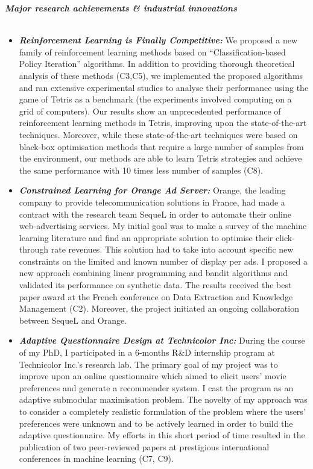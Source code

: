 \noindent\textit{\textbf{Major research achievements \& industrial innovations}}\\[-.4cm]\noindent\makebox[\linewidth]{\rule{\columnwidth}{0.4pt}}\\ %
\begin{itemize}
\item \textit{} \textit{\textbf{Reinforcement Learning is Finally Competitive:}} We proposed a new family of reinforcement learning methods based on ``Classification-based Policy Iteration'' algorithms. In addition to providing thorough theoretical analysis of these methods (C3,C5), we implemented the proposed algorithms and ran extensive experimental studies to analyse their performance using the game of Tetris as a benchmark (the experiments involved computing on a grid of computers). Our results show an unprecedented performance of reinforcement learning methods in Tetris, improving upon the state-of-the-art techniques. Moreover, while these state-of-the-art techniques were based on black-box optimisation methods that require a large number of samples from the environment, our methods are able to learn Tetris strategies and achieve the same performance with 10 times less number of samples (C8).
\item \textit{} \textit{\textbf{Constrained Learning for Orange Ad Server:}} Orange, the leading company to provide telecommunication solutions in France, had made a contract with the research team SequeL in order to automate their online web-advertising services. My initial goal was to make a survey of the machine learning literature and find an appropriate solution to optimise their click-through rate revenues. This solution had to take into account specific new constraints on the limited and known number of display per ads. I proposed a new approach combining linear programming and bandit algorithms and validated its performance on synthetic data. The results received the best paper award at the French conference on Data Extraction and Knowledge Management (C2). Moreover, the project initiated an ongoing collaboration between SequeL and Orange.  
\item \textit{} \textit{\textbf{Adaptive Questionnaire Design at Technicolor Inc:}} 
During the course of my PhD, I participated in a 6-months R\&D internship program at Technicolor Inc.'s research lab. The primary goal of my project was to improve upon an online questionnaire which aimed to elicit users' movie preferences and generate a recommender system. I cast the program as an adaptive submodular maximisation problem. 
The novelty of my approach was to consider a completely realistic formulation of the problem where the users' preferences were unknown and to be actively learned in order to build the adaptive questionnaire.  
My efforts in this short period of time resulted in the publication of two peer-reviewed papers at prestigious international conferences in machine learning (C7, C9). 
\end{itemize}



